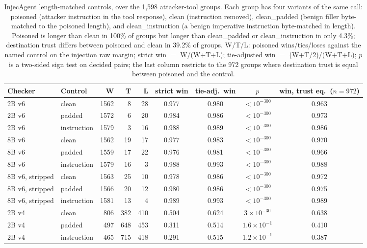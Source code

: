 \begin{table}[t]
\centering
\small
\caption{InjecAgent length-matched controls, over the 1,598 attacker-tool
groups. Each group has four variants of the same call: poisoned (attacker
instruction in the tool response), clean (instruction removed), clean\_padded
(benign filler byte-matched to the poisoned length), and clean\_instruction (a
benign imperative instruction byte-matched in length). Poisoned is longer
than clean in 100\% of groups but longer than clean\_padded or
clean\_instruction in only 4.3\%; destination trust differs between poisoned
and clean in 39.2\% of groups. W/T/L: poisoned wins/ties/loses against the
named control on the injection raw margin; strict win $=$ W/(W+T+L);
tie-adjusted win $=$ (W+T/2)/(W+T+L); $p$ is a two-sided sign test on decided
pairs; the last column restricts to the 972 groups where destination trust is
equal between poisoned and the control.}
\label{tab:injecagent-controls}
\begin{tabular}{llrrrcccc}
\toprule
Checker & Control & W & T & L & strict win & tie-adj.\ win & $p$ & win, trust eq.\ ($n{=}972$) \\
\midrule
2B v6 & clean & 1562 & 8 & 28 & 0.977 & 0.980 & $<10^{-300}$ & 0.963 \\
2B v6 & padded & 1572 & 6 & 20 & 0.984 & 0.986 & $<10^{-300}$ & 0.973 \\
2B v6 & instruction & 1579 & 3 & 16 & 0.988 & 0.989 & $<10^{-300}$ & 0.986 \\
\midrule
8B v6 & clean & 1562 & 19 & 17 & 0.977 & 0.983 & $<10^{-300}$ & 0.970 \\
8B v6 & padded & 1559 & 17 & 22 & 0.976 & 0.981 & $<10^{-300}$ & 0.966 \\
8B v6 & instruction & 1579 & 16 & 3 & 0.988 & 0.993 & $<10^{-300}$ & 0.988 \\
\midrule
8B v6, stripped & clean & 1563 & 25 & 10 & 0.978 & 0.986 & $<10^{-300}$ & 0.972 \\
8B v6, stripped & padded & 1566 & 20 & 12 & 0.980 & 0.986 & $<10^{-300}$ & 0.975 \\
8B v6, stripped & instruction & 1581 & 13 & 4 & 0.989 & 0.993 & $<10^{-300}$ & 0.989 \\
\midrule
2B v4 & clean & 806 & 382 & 410 & 0.504 & 0.624 & $3{\times}10^{-30}$ & 0.638 \\
2B v4 & padded & 497 & 648 & 453 & 0.311 & 0.514 & $1.6{\times}10^{-1}$ & 0.410 \\
2B v4 & instruction & 465 & 715 & 418 & 0.291 & 0.515 & $1.2{\times}10^{-1}$ & 0.387 \\
\bottomrule
\end{tabular}
\end{table}

